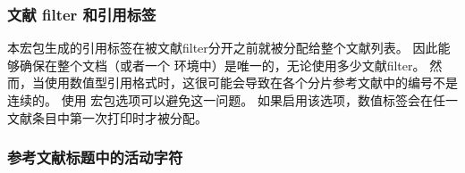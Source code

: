 \subsubsection{文献 filter 和引用标签}%
\label{use:cav:lab}


本宏包生成的引用标签在被文献filter分开之前就被分配给整个文献列表。
因此能够确保在整个文档（或者一个  环境中）是唯一的，无论使用多少文献filter。
然而，当使用数值型引用格式时，这很可能会导致在各个分片参考文献中的编号不是连续的。
使用  宏包选项可以避免这一问题。
如果启用该选项，数值标签会在任一文献条目中第一次打印时才被分配。

\subsubsection{参考文献标题中的活动字符}%
\label{use:cav:act}



